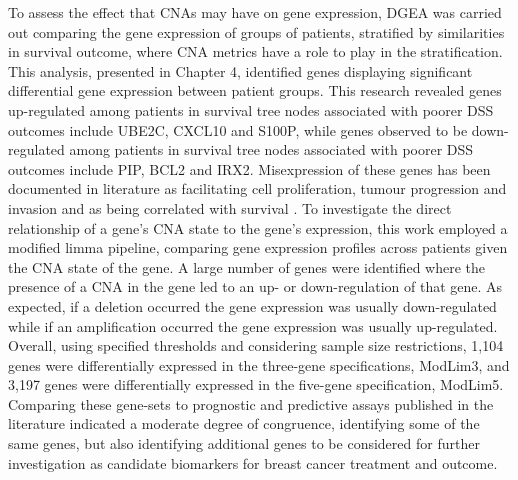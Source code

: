 To assess the effect that CNAs may have on gene expression, DGEA was carried out comparing the gene expression of groups of patients, stratified by similarities in survival outcome, where CNA metrics have a role to play in the stratification. This analysis, presented in Chapter 4, identified genes displaying significant differential gene expression between patient groups. This research revealed genes up-regulated among patients in survival tree nodes associated with poorer DSS outcomes include UBE2C, CXCL10 and S100P, while genes observed to be down-regulated among patients in survival tree nodes associated with poorer DSS outcomes include PIP, BCL2 and IRX2. Misexpression of these genes has been documented in literature as facilitating cell proliferation, tumour progression and invasion and as being correlated with survival \citep{pmid21195708, pmid31067633, pmid33681290, pmid20664598, pmid26560478, pmid30555735}. To investigate the direct relationship of a gene’s CNA state to the gene’s expression, this work employed a modified limma pipeline, comparing gene expression profiles across patients given the CNA state of the gene. A large number of genes were identified where the presence of a CNA in the gene led to an up- or down-regulation of that gene. As expected, if a deletion occurred the gene expression was usually down-regulated while if an amplification occurred the gene expression was usually up-regulated. Overall, using specified thresholds and considering sample size restrictions, 1,104 genes were differentially expressed in the three-gene specifications, ModLim3, and 3,197 genes were differentially expressed in the five-gene specification, ModLim5. Comparing these gene-sets to prognostic and predictive assays published in the literature indicated a moderate degree of congruence, identifying some of the same genes, but also identifying additional genes to be considered for further investigation as candidate biomarkers for breast cancer treatment and outcome.   

